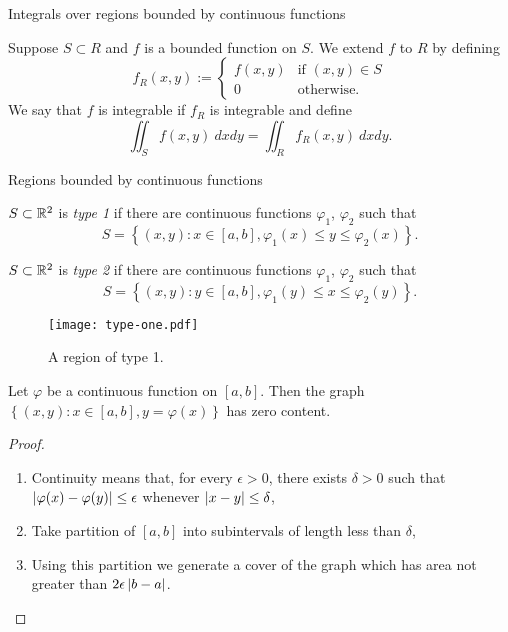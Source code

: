 {Integrals over regions bounded by continuous functions}


\begin{definition}
    Suppose \(S\subset R\) and \(f\) is a bounded function on \(S\).
    We extend \(f\) to \(R\) by defining
    \[
        f_R(x,y) := \begin{cases}
            f(x,y) & \text{if \((x,y)\in S\)} \\
            0      & \text{otherwise}.
        \end{cases}
    \]
    We say that \(f\) is integrable if \(f_{R}\) is integrable and define
    \[
        \iint_{S} f(x,y) \ dxdy = \iint_{R} f_{R}(x,y) \ dx dy.
    \]
\end{definition}




{Regions bounded by continuous functions}





\begin{definition}[type 1]
    \(S \subset \mathbb{R}^2\) is \emph{type 1} if there are continuous functions \(\varphi_1\), \(\varphi_2\) such that
    \[
        S = \left\{(x,y): x \in [a,b], \varphi_1(x) \leq y \leq \varphi_2(x)\right\}.
    \]
\end{definition}
\begin{definition}[type 2]
    \(S \subset \mathbb{R}^2\) is \emph{type 2} if there are continuous functions \(\varphi_1\), \(\varphi_2\) such that
    \[
        S = \left\{(x,y): y \in [a,b], \varphi_1(y) \leq x \leq \varphi_2(y)\right\}.
    \]
\end{definition}



\begin{figure}
    \centering
    \texttt{[image: type-one.pdf]}
    \caption{A region of type 1.}
\end{figure}


\begin{theorem}
    Let \(\varphi\) be a continuous function on \([a,b]\).
    Then the graph
    \(\left\{(x,y): x\in [a,b], y=\varphi(x)\right\}\)
    has zero content.
\end{theorem}
\begin{proof}
    \begin{enumerate}
        \item Continuity means that, for every \(\epsilon>0\), there exists \(\delta>0\) such that \(\left|\varphi(x) - \varphi(y)\right|\leq \epsilon\) whenever \(\left|x-y\right|\leq \delta\),
        \item Take partition of \([a,b]\) into subintervals of length less than \(\delta\),
        \item Using this partition we generate a cover of the graph which has area not greater than \(2\epsilon \left|b-a\right|\).
    \end{enumerate}
\end{proof}




